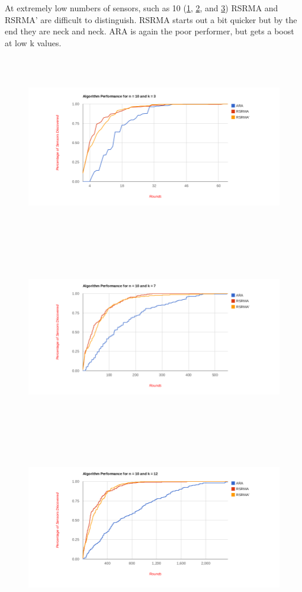 At extremely low numbers of sensors, such as 10 (\ref{fig:n10k3}, \ref{fig:n10k7}, and \ref{fig:n10k12}) RSRMA and RSRMA' are difficult to distinguish. RSRMA starts out a bit quicker but by the end they are neck and neck. ARA is again the poor performer, but gets a boost at low k values.

\begin{figure}[ht]
\caption{}
\includegraphics[height = 8cm]{pics/graph10k3.png}\\[0.5cm]    
\label{fig:n10k3}
\end{figure}

\begin{figure}[ht]
\caption{}
\includegraphics[height = 8cm]{pics/graph10k7.png}\\[0.5cm]   
\label{fig:n10k7} 
\end{figure}

\begin{figure}[ht]
\caption{}
\includegraphics[height = 8cm]{pics/graph10k12.png}\\[0.5cm] 
\label{fig:n10k12}   
\end{figure}


